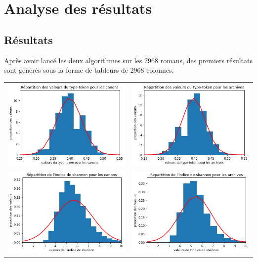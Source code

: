 \documentclass[a4paper,twoside,12pt]{book}
\begin{document}
 
\chapter{Analyse des résultats}

\section{Résultats}

Après avoir lancé les deux algorithmes sur les 2968 romans, des premiers résultats sont générés sous la forme de tableurs de 2968 colonnes. 

\bigskip
\begin{tabular}{cc}
    \centering
    \includegraphics[width=7cm]{img/03_tt_canon_repartition.png} & 
    \includegraphics[width=7cm]{img/04_tt_arch_repartition.png} \\ 
    \includegraphics[width=7cm]{img/05_shannon_canon_repartition.png} & 
    \includegraphics[width=7cm]{img/06_shannon_arch_repartition.png} \\ 
\end{tabular}
\end{document}
